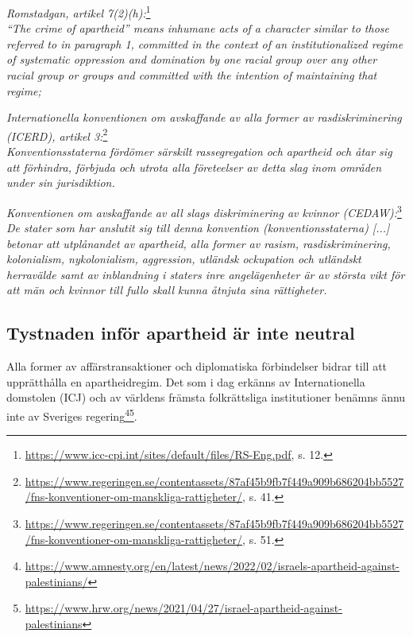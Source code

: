 \documentclass[12pt]{article}
\newcommand{\utlandslagrum}[3]{%
  \vspace{3mm}%
  \noindent\textit{#1}\footnote{\url{#2}#3}\\[0.5ex]
}
\begin{document}
\utlandslagrum{Romstadgan, artikel 7(2)(h):}{https://www.icc-cpi.int/sites/default/files/RS-Eng.pdf}{, s. 12.}
\textit{“The crime of apartheid” means inhumane acts of a character similar to those referred to in paragraph 1, committed in the context of an institutionalized regime of systematic oppression and domination by one racial group over any other racial group or groups and committed with the intention of maintaining that regime;  }

\vspace{4mm}

\utlandslagrum{Internationella konventionen om avskaffande av alla former av rasdiskriminering (ICERD), artikel 3:}{https://www.regeringen.se/contentassets/87af45b9fb7f449a909b686204bb5527/fns-konventioner-om-manskliga-rattigheter/}{, s. 41.}
\textit{Konventionsstaterna fördömer särskilt rassegregation och apartheid och åtar sig att förhindra, förbjuda och utrota alla företeelser av detta slag inom områden under sin jurisdiktion.}

\vspace{4mm}

\utlandslagrum{Konventionen om avskaffande av all slags diskriminering av kvinnor (CEDAW):}{https://www.regeringen.se/contentassets/87af45b9fb7f449a909b686204bb5527/fns-konventioner-om-manskliga-rattigheter/}{, s. 51.}
\textit{De stater som har anslutit sig till denna konvention (konventionsstaterna) [...] betonar att utplånandet av apartheid, alla former av rasism, rasdiskriminering, kolonialism, nykolonialism, aggression, utländsk ockupation och utländskt herravälde samt av inblandning i staters inre angelägenheter är av största vikt för att män och kvinnor till fullo skall kunna åtnjuta sina rättigheter.}

\subsection*{Tystnaden inför apartheid är inte neutral}

Alla former av affärstransaktioner och diplomatiska förbindelser bidrar till att upprätthålla en apartheidregim.  
Det som i dag erkänns av Internationella domstolen (ICJ) och av världens främsta folkrättsliga institutioner benämns ännu inte av Sveriges regering\footnote{\url{https://www.amnesty.org/en/latest/news/2022/02/israels-apartheid-against-palestinians/}}\footnote{\url{https://www.hrw.org/news/2021/04/27/israel-apartheid-against-palestinians}}.  
\end{document}
